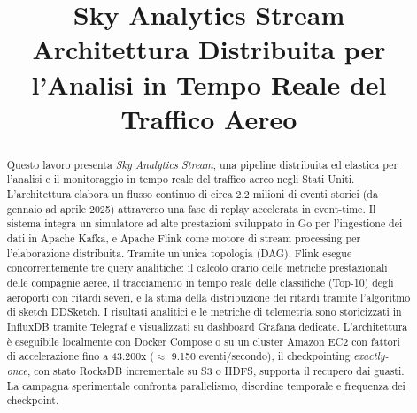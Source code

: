 \documentclass[conference]{IEEEtran}
\begin{document}
\title{Sky Analytics Stream \\ \vspace{0.15cm} \large Architettura Distribuita per l'Analisi in Tempo Reale del Traffico Aereo}

\author{
    \and
}

%

\maketitle
\thispagestyle{headings}


\begin{abstract}
Questo lavoro presenta \textit{Sky Analytics Stream}, una pipeline distribuita ed elastica per l'analisi e il monitoraggio in tempo reale del traffico aereo negli Stati Uniti. L'architettura elabora un flusso continuo di circa 2.2 milioni di eventi storici (da gennaio ad aprile 2025) attraverso una fase di replay accelerata in event-time. Il sistema integra un simulatore ad alte prestazioni sviluppato in Go per l'ingestione dei dati in Apache Kafka, e Apache Flink come motore di stream processing per l'elaborazione distribuita. Tramite un'unica topologia (DAG), Flink esegue concorrentemente tre query analitiche: il calcolo orario delle metriche prestazionali delle compagnie aeree, il tracciamento in tempo reale delle classifiche (Top-10) degli aeroporti con ritardi severi, e la stima della distribuzione dei ritardi tramite l'algoritmo di sketch DDSketch. I risultati analitici e le metriche di telemetria sono storicizzati in InfluxDB tramite Telegraf e visualizzati su dashboard Grafana dedicate. L'architettura è eseguibile localmente con Docker Compose o su un cluster Amazon EC2 con fattori di accelerazione fino a 43.200x ($\approx$ 9.150 eventi/secondo), il checkpointing \emph{exactly-once}, con stato RocksDB incrementale su S3 o HDFS, supporta il recupero dai guasti. La campagna sperimentale confronta parallelismo, disordine temporale e frequenza dei checkpoint.
\end{abstract}
\end{document}
